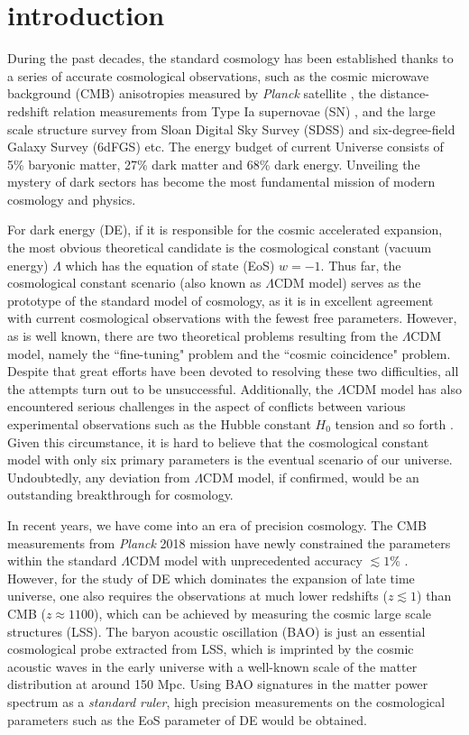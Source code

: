 \documentclass[aps,prd,amsmath,amssymb,showpacs,floats,floatfix,nofootinbib,reprint]{revtex4-1}
\begin{document}
\section{introduction}
During the past decades, the standard cosmology has been established thanks to a series of accurate cosmological observations, such as the cosmic microwave background (CMB) anisotropies measured by {\it Planck} satellite \cite{Aghanim:2018eyx,Aghanim:2015xee,Ade:2015xua,Ade:2013zuv}, the distance-redshift relation measurements from Type Ia supernovae (SN) \cite{Riess:1998cb,Perlmutter:1998np}, and the large scale structure survey from Sloan Digital Sky Survey (SDSS) and six-degree-field Galaxy Survey (6dFGS) \cite{Reid:2009xm,Reid:2012sw,Ross:2014qpa,Beutler:2011hx} etc. The energy budget of current Universe consists of {5\%} baryonic matter, {27\%} dark matter and {68\%} dark energy. Unveiling the mystery of dark sectors has become the most fundamental mission of modern cosmology and physics. 

For dark energy (DE), if it is responsible for the cosmic accelerated expansion, the most obvious theoretical candidate is the cosmological constant (vacuum energy) $\Lambda$ which has the equation of state (EoS) $w=-1$. Thus far, the cosmological constant scenario (also {known} as $\Lambda$CDM model) serves as the prototype of {the standard model of} cosmology, as it is in excellent agreement with current cosmological observations with the {fewest} free parameters. However, as is well known, there are two theoretical problems resulting from the $\Lambda$CDM model, namely the ``fine-tuning" problem and the ``cosmic coincidence" problem. Despite that great efforts have been devoted to resolving these two difficulties, all the attempts turn out to be unsuccessful. Additionally, the $\Lambda$CDM model has also encountered serious challenges in the aspect of conflicts between various experimental observations such as the Hubble constant $H_{0}$ tension and so forth \cite{Ade:2015xua}. Given this circumstance, it is hard to believe that the cosmological constant model with only six primary parameters is the eventual scenario of our universe. Undoubtedly, any deviation from $\Lambda$CDM model, if confirmed, would be an outstanding breakthrough for cosmology.

In recent years, we have come into an era of precision cosmology. The CMB measurements from {\it Planck} 2018 mission have newly constrained the parameters within the standard $\Lambda$CDM model with unprecedented accuracy $\lesssim 1\%$ \cite{Aghanim:2018eyx}. However, for the study of DE which dominates the expansion of late time universe, one also requires the observations at much lower redshifts ($z\lesssim 1$) than CMB ($z\approx 1100$), which can be achieved by measuring the cosmic large scale structures (LSS). The baryon acoustic oscillation (BAO) is just an essential cosmological probe {extracted from} LSS, which is imprinted by the cosmic acoustic waves in the early universe with a well-known scale of the matter distribution at around 150 Mpc. Using BAO signatures in the matter power spectrum as a {\it standard ruler}, high precision measurements on the cosmological parameters such as the EoS parameter of DE would be obtained. 
\end{document}
